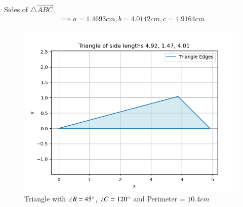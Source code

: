 \documentclass[journal]{IEEEtran}
\begin{document}
Sides of $\triangle\vec{ABC}$,
\begin{align}
    \implies a=1.4693cm, b=4.0142cm, c=4.9164cm
\end{align}
\begin{figure}[ht!]
	\centering
   	\includegraphics[width=0.8\linewidth]{figs/fig.png}
   	\caption{Triangle with $\angle B=45\degree$, $\angle C=120\degree$ and Perimeter = $10.4cm$}
\label{Plot}
\end{figure}
\end{document}
